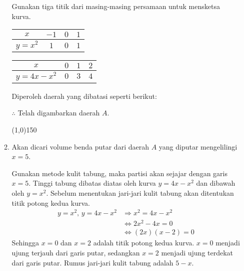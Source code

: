 \begin{enumerate}[leftmargin=*, label={\arabic*}.]
\begin{enumerate}[label={\alph*}.]
    Gunakan tiga titik dari masing-masing persamaan untuk mensketsa kurva.
    \begin{center}
        \begin{tabular}{|c|c|c|c|}\hline
            $x$ & $-1$ & $0$ & $1$ \\ \hline
            $y=x^{2}$ & $1$ & $0$ & $1$ \\ \hline
        \end{tabular}\quad
        \begin{tabular}{|c|c|c|c|}\hline
            $x$ & $0$ & $1$ & $2$ \\ \hline
            $y=4x-x^{2}$ & $0$ & $3$ & $4$ \\ \hline
        \end{tabular}
    \end{center}
    Diperoleh daerah yang dibatasi seperti berikut:

    

    $\therefore$ Telah digambarkan daerah $A$.


\begin{center}\line(1,0){150}\end{center}


    \item Akan dicari volume benda putar dari daerah $A$ yang diputar mengelilingi $x=5$.
    
    Gunakan metode kulit tabung, maka partisi akan sejajar dengan garis $x=5$. Tinggi 
    tabung dibatas diatas oleh kurva $y=4x-x^{2}$ dan dibawah oleh $y=x^{2}$. Sebelum menentukan 
    jari-jari kulit tabung akan ditentukan titik potong kedua kurva.
    \begin{align*}
        y = x^{2},\,y=4x-x^{2} &\Longrightarrow x^{2}=4x-x^{2}\\
        & \iff 2x^{2}-4x=0\\
        & \iff (2x)(x-2)=0
    \end{align*}
    Sehingga $x=0$ dan $x=2$ adalah titik potong kedua kurva. $x=0$ menjadi ujung terjauh 
    dari garis putar, sedangkan $x=2$ menjadi ujung terdekat dari garis putar. 
    Rumus jari-jari kulit tabung adalah $5-x$.


\end{enumerate}
\end{enumerate}
